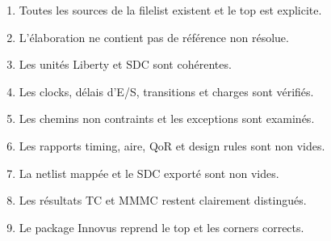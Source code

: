 \documentclass[11pt,a4paper,openany]{report}
\begin{document}
\begin{enumerate}
  \item Toutes les sources de la filelist existent et le top est explicite.
  \item L'élaboration ne contient pas de référence non résolue.
  \item Les unités Liberty et SDC sont cohérentes.
  \item Les clocks, délais d'E/S, transitions et charges sont vérifiés.
  \item Les chemins non contraints et les exceptions sont examinés.
  \item Les rapports timing, aire, QoR et design rules sont non vides.
  \item La netlist mappée et le SDC exporté sont non vides.
  \item Les résultats TC et MMMC restent clairement distingués.
  \item Le package Innovus reprend le top et les corners corrects.
\end{enumerate}
\end{document}

